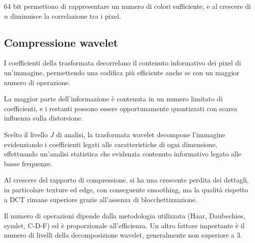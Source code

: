 64 bit permettono di rappresentare un numero di colori sufficiente, e al crescere di $n$ diminuisce la correlazione tra i pixel.

\subsection{Compressione wavelet}
I coefficienti della trasformata decorrelano il contenuto informativo dei pixel di un'immagine, permettendo una codifica più efficiente anche se con un maggior numero di operazione.

La maggior parte dell'informazione è contenuta in un numero limitato di coefficienti, e i restanti possono essere opportunamente quantizzati con scarsa influenza sulla distorsione.

Scelto il livello $J$ di analisi, la trasformata wavelet decompone l'immagine evidenziando i coefficienti legati alle caratteristiche di ogni dimensione, effettuando un'analisi statistica che evidenzia contenuto informativo legato alle basse frequenze.

Al crescere del rapporto di compressione, si ha una crescente perdita dei dettagli, in particolare texture ed edge, con conseguente smoothing, ma la qualità rispetto a DCT rimane superiore grazie all'assenza di blocchettizzazione.

Il numero di operazioni dipende dalla metodologia utilizzata (Haar, Daubechies, symlet, C-D-F) ed è  proporzionale all'efficienza. Un altro fattore importante è il numero di livelli della decomposizione wavelet, generalmente non superiore a 3.



